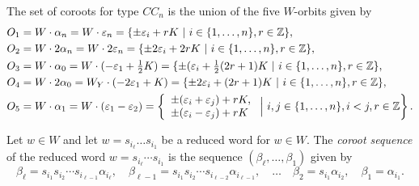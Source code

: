 \documentclass[11pt]{article}
\theoremstyle{plain}
\theoremstyle{definition}
\theoremstyle{remark}
\numberwithin{equation}{section}
\def\ZZ{\mathbb{Z}}
\newcounter{r}
\newcounter{s}
\begin{document}
The set of coroots for type $CC_n$ is the union of the five $W$-orbits given by
\begin{align*}
O_1 
&= W\cdot\alpha_n = W\cdot \varepsilon_n 
= \{ \pm \varepsilon_i+rK \ |\  i\in \{1, \ldots, n\}, r\in \ZZ\}, \\
O_2 &= W\cdot 2\alpha_n = W\cdot 2\varepsilon_n
= \{ \pm 2\varepsilon_i+2rK \ |\  i\in \{1, \ldots, n\}, r\in \ZZ\} , \\
O_3 
&= W\cdot \alpha_0 = W\cdot (-\varepsilon_1+\hbox{$\frac12$}K) 
= \{ \pm(\varepsilon_i+\hbox{$\frac12$}(2r+1)K \ |\  i\in \{1, \ldots, n\}, r\in \ZZ\}, \\
O_4 
&= W\cdot 2\alpha_0 = W_Y\cdot (-2\varepsilon_1+K)
= \{ \pm 2\varepsilon_i+(2r+1)K \ |\  i\in \{1, \ldots, n\}, r\in \ZZ\} , \\
O_5  
&= W\cdot \alpha_1 = W\cdot (\varepsilon_1-\varepsilon_2)
= 
\left\{ \begin{array}{l}
\pm(\varepsilon_i+\varepsilon_j)+rK,  \\
\pm(\varepsilon_i-\varepsilon_j)+rK  
\end{array}\ \Big\vert\ 
i,j\in \{1, \ldots, n\}, i<j, r\in \ZZ \right\}.
\end{align*}

Let $w\in W$ and let $w=s_{i_\ell} \ldots s_{i_1}$ be a reduced word for $w \in W$.
The \emph{coroot sequence} of the reduced word $w=s_{i_\ell}\cdots s_{i_1}$ is the sequence
$(\beta_\ell,\ldots, \beta_1)$ given by 
\begin{equation}
\beta_\ell = 
s_{i_1}s_{i_2}\cdots s_{i_{\ell-1}}\alpha_{i_\ell}, \quad
\beta_{\ell-1} = 
s_{i_1}s_{i_2}\cdots s_{i_{\ell-2}}\alpha_{i_{\ell-1}}, \quad \ldots \quad
\beta_2 = s_{i_1}\alpha_{i_2}, \quad
\beta_1 = \alpha_{i_1}.
\label{crtseq}
\end{equation}
\end{document}
